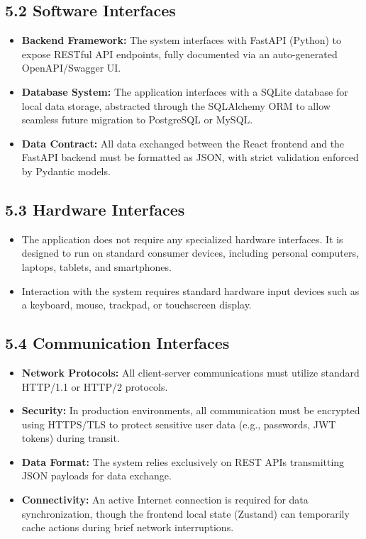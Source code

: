 \documentclass[12pt]{article}
\begin{document}
\subsection*{5.2 Software Interfaces}
\begin{itemize}
    \item \textbf{Backend Framework:} The system interfaces with FastAPI (Python) to expose RESTful API endpoints, fully documented via an auto-generated OpenAPI/Swagger UI.
    \item \textbf{Database System:} The application interfaces with a SQLite database for local data storage, abstracted through the SQLAlchemy ORM to allow seamless future migration to PostgreSQL or MySQL.
    \item \textbf{Data Contract:} All data exchanged between the React frontend and the FastAPI backend must be formatted as JSON, with strict validation enforced by Pydantic models.
\end{itemize}

\subsection*{5.3 Hardware Interfaces}
\begin{itemize}
    \item The application does not require any specialized hardware interfaces. It is designed to run on standard consumer devices, including personal computers, laptops, tablets, and smartphones.
    \item Interaction with the system requires standard hardware input devices such as a keyboard, mouse, trackpad, or touchscreen display.
\end{itemize}

\subsection*{5.4 Communication Interfaces}
\begin{itemize}
    \item \textbf{Network Protocols:} All client-server communications must utilize standard HTTP/1.1 or HTTP/2 protocols.
    \item \textbf{Security:} In production environments, all communication must be encrypted using HTTPS/TLS to protect sensitive user data (e.g., passwords, JWT tokens) during transit.
    \item \textbf{Data Format:} The system relies exclusively on REST APIs transmitting JSON payloads for data exchange.
    \item \textbf{Connectivity:} An active Internet connection is required for data synchronization, though the frontend local state (Zustand) can temporarily cache actions during brief network interruptions.
\end{itemize}
\end{document}
